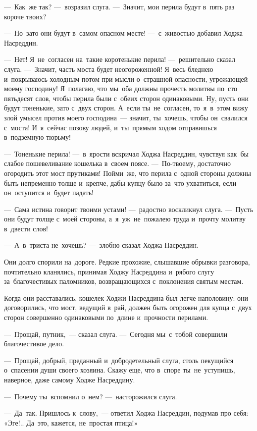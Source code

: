 \documentclass[12pt,a4paper]{book}
\begin{document}
—~Как~же так? —~возразил слуга. —~Значит, мои перила будут в~пять раз короче твоих?

—~Но~зато они будут в~самом опасном месте! —~с~живостью добавил Ходжа Насреддин.

—~Нет! Я~не~согласен на~такие коротенькие перила! —~решительно сказал слуга. —~Значит, часть моста будет неогороженной! Я~весь бледнею и~покрываюсь холодным потом при мысли о~страшной опасности, угрожающей моему господину! Я~полагаю, что мы~оба должны прочесть молитвы по~сто пятьдесят слов, чтобы перила были с~обеих сторон одинаковыми. Ну, пусть они будут тоненькие, зато с~двух сторон. А~если ты~не~согласен, то~я~в~этом вижу злой умысел против моего господина~— значит, ты~хочешь, чтобы он~свалился с~моста! И~я~сейчас позову людей, и~ты~прямым ходом отправишься в~подземную тюрьму!

—~Тоненькие перила! —~в~ярости вскричал Ходжа Насреддин, чувствуя как~бы слабое пошевеливание кошелька в~своем поясе. —~По-твоему, достаточно огородить этот мост прутиками! Пойми~же, что перила с~одной стороны должны быть непременно толще и~крепче, дабы купцу было за~что ухватиться, если он~оступится и~будет падать!

—~Сама истина говорит твоими устами! —~радостно воскликнул слуга. —~Пусть они будут толще с~моей стороны, а~я~уж~не~пожалею труда и~прочту молитву в~двести слов!

—~А~в~триста не~хочешь? —~злобно сказал Ходжа Насреддин.

Они долго спорили на~дороге. Редкие прохожие, слышавшие обрывки разговора, почтительно кланялись, принимая Ходжу Насреддина и~рябого слугу за~благочестивых паломников, возвращающихся с~поклонения святым местам.

Когда они расставались, кошелек Ходжи Насреддина был легче наполовину: они договорились, что мост, ведущий в~рай, должен быть огорожен для купца с~двух сторон совершенно одинаковыми по~длине и~прочности перилами.

—~Прощай, путник,~— сказал слуга. —~Сегодня мы~с~тобой совершили благочестивое дело.

—~Прощай, добрый, преданный и~добродетельный слуга, столь пекущийся о~спасении души своего хозяина. Скажу еще, что в~споре ты~не~уступишь, наверное, даже самому Ходже Насреддину.

—~Почему ты~вспомнил о~нем? —~насторожился слуга.

—~Да~так. Пришлось к~слову,~— ответил Ходжа Насреддин, подумав про себя: «Эге!.. Да~это, кажется, не~простая птица!»
\end{document}
